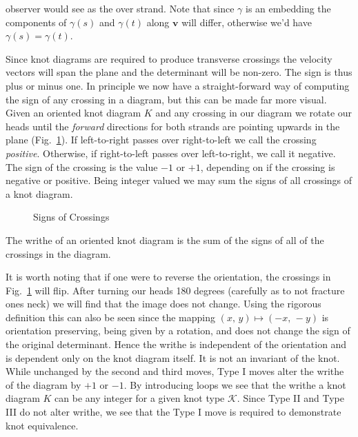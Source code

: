         observer would see as the over strand. Note that since $\gamma$ is
        an embedding the components of $\gamma(s)$ and $\gamma(t)$ along
        $\mathbf{v}$ will differ, otherwise we'd have $\gamma(s)=\gamma(t)$.
        \par\hfill\par
        Since knot diagrams are required to produce transverse crossings the
        velocity vectors will span the plane and the determinant will be
        non-zero. The sign is thus plus or minus one. In principle we now have
        a straight-forward way of computing the sign of any crossing in a
        diagram, but this can be made far more visual.
        Given an oriented knot diagram $K$ and any crossing in our
        diagram we rotate our heads until the \textit{forward} directions for
        both strands are pointing upwards in the plane
        (Fig.~\ref{fig:crossing_signs}). If left-to-right passes over
        right-to-left we call the crossing \textit{positive}. Otherwise,
        if right-to-left passes over left-to-right, we call it negative.
        The sign of the crossing is the value $-1$ or $+1$, depending on if
        the crossing is negative or positive. Being integer valued we may sum
        the signs of all crossings of a knot diagram.
        \begin{figure}
            \centering
            \caption{Signs of Crossings}
            \label{fig:crossing_signs}
        \end{figure}
        \begin{definition}
            The writhe of an oriented knot diagram is the sum of the signs of
            all of the crossings in the diagram.
        \end{definition}
        It is worth noting that if one were to reverse the orientation, the
        crossings in Fig.~\ref{fig:crossing_signs} will flip. After turning our
        heads 180 degrees (carefully as to not fracture ones neck) we will
        find that the image does not change. Using the rigorous definition this
        can also be seen since the mapping $(x,\,y)\mapsto(-x,\,-y)$ is
        orientation preserving, being given by a rotation, and does not change
        the sign of the original determinant. Hence the writhe is independent of
        the orientation and is dependent only on the knot diagram itself. It is
        not an invariant of the knot. While unchanged by the second and third
        moves, Type I moves alter the writhe of the diagram by $+1$ or
        $-1$. By introducing loops we see that the writhe a knot diagram $K$
        can be any integer for a given knot type $\mathcal{K}$.
        Since Type II and Type III do not
        alter writhe, we see that the Type I move is required to demonstrate
        knot equivalence.
